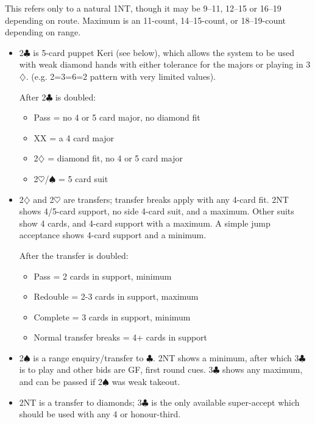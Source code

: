 \documentclass[a4paper,14pt]{extarticle}
\begin{document}
This refers only to a natural 1NT, though it may be 9--11, 12--15 or 16--19
depending on route. Maximum is an 11-count, 14--15-count, or 18--19-count
depending on range.

\begin{itemize}

\item 2$\clubsuit$ is 5-card puppet Keri (see below), which allows the system to be used with weak diamond hands with either tolerance for the majors or playing in 3$\diamondsuit$. (e.g. 2=3=6=2 pattern with very limited values).

\label{note:9}

After 2$\clubsuit$ is doubled:

	\begin{itemize}
	\item Pass = no 4 or 5 card major, no diamond fit
	\item XX = a 4 card major
	\item 2$\diamondsuit$ = diamond fit, no 4 or 5 card major
	\item 2$\heartsuit$/$\spadesuit$ = 5 card suit
	\end{itemize}

\item 2$\diamondsuit$ and 2$\heartsuit$ are transfers; transfer breaks apply with any 4-card fit.  2NT
shows 4/5-card support, no side 4-card suit, and a maximum.  Other suits
show 4 cards, and 4-card support with a maximum.  A simple jump acceptance
shows 4-card support and a minimum.

After the transfer is doubled:

	\begin{itemize}
	\item Pass = 2 cards in support, minimum
	\item Redouble = 2-3 cards in support, maximum
	\item Complete = 3 cards in support, minimum
	\item Normal transfer breaks = 4+ cards in support
	\end{itemize}

\item 2$\spadesuit$ is a range enquiry/transfer to $\clubsuit$.  2NT shows a
minimum, after which 3$\clubsuit$ is to play and other bids are GF, first round
cues.  3$\clubsuit$ shows any maximum, and can be passed if 2$\spadesuit$ was
weak takeout.

\item 2NT is a transfer to diamonds; 3$\clubsuit$ is the only available super-accept which 
should be used with any 4 or honour-third.


\end{itemize}
\end{document}
